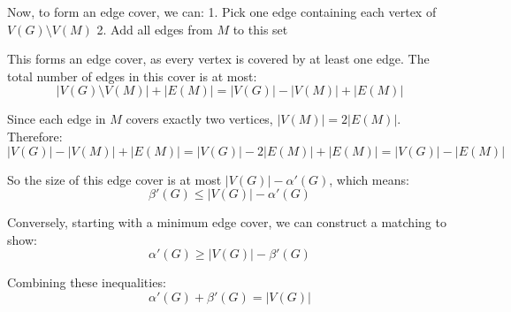 \documentclass{article}
\theoremstyle{definition}
\begin{document}
Now, to form an edge cover, we can:
1. Pick one edge containing each vertex of $V(G) \setminus V(M)$
2. Add all edges from $M$ to this set

This forms an edge cover, as every vertex is covered by at least one edge. The total number of edges in this cover is at most:
\begin{equation}
|V(G) \setminus V(M)| + |E(M)| = |V(G)| - |V(M)| + |E(M)|
\end{equation}

Since each edge in $M$ covers exactly two vertices, $|V(M)| = 2|E(M)|$. Therefore:
\begin{equation}
|V(G)| - |V(M)| + |E(M)| = |V(G)| - 2|E(M)| + |E(M)| = |V(G)| - |E(M)|
\end{equation}

So the size of this edge cover is at most $|V(G)| - \alpha'(G)$, which means:
\begin{equation}
\beta'(G) \leq |V(G)| - \alpha'(G)
\end{equation}

Conversely, starting with a minimum edge cover, we can construct a matching to show:
\begin{equation}
\alpha'(G) \geq |V(G)| - \beta'(G)
\end{equation}

Combining these inequalities:
\begin{equation}
\alpha'(G) + \beta'(G) = |V(G)|
\end{equation}
\end{document}
